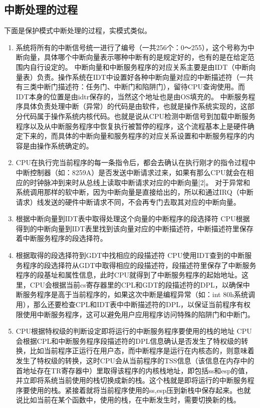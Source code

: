 \documentclass[a4paper, 11pt]{article} %
\begin{document}
\subsection{中断处理的过程}\cite{intprocess}
下面是保护模式中断处理的过程，实模式类似。
\begin{enumerate}
  \item 系统将所有的中断信号统一进行了编号（一共256个：0～255），这个号称为中断向量，具体哪个中断向量表示哪种中断有的是规定好的，也有的是在给定范围内自行设定的。  中断向量和中断服务程序的对应关系主要是由IDT（中断向量表）负责。操作系统在IDT中设置好各种中断向量对应的中断描述符（一共有三类中断门描述符：任务门、中断门和陷阱门），留待CPU查询使用。而IDT本身的位置是由idtr保存的，当然这个地址也是由OS填充的。
  中断服务程序具体负责处理中断（异常）的代码是由软件，也就是操作系统实现的，这部分代码属于操作系统内核代码。也就是说从CPU检测中断信号到加载中断服务程序以及从中断服务程序中恢复执行被暂停的程序，这个流程基本上是硬件确定下来的，而具体的中断向量和服务程序的对应关系设置和中断服务程序的内容是由操作系统确定的。
  
  \item CPU在执行完当前程序的每一条指令后，都会去确认在执行刚才的指令过程中中断控制器（如：8259A）是否发送中断请求过来，如果有那么CPU就会在相应的时钟脉冲到来时从总线上读取中断请求对应的中断向量[2]。
  对于异常和系统调用那样的软中断，因为中断向量是直接给出的，所以和通过IRQ（中断请求）线发送的硬件中断请求不同，不会再专门去取其对应的中断向量。
  
  \item 根据中断向量到IDT表中取得处理这个向量的中断程序的段选择符
  CPU根据得到的中断向量到IDT表里找到该向量对应的中断描述符，中断描述符里保存着中断服务程序的段选择符。
  
  \item 根据取得的段选择符到GDT中找相应的段描述符
  CPU使用IDT查到的中断服务程序的段选择符从GDT中取得相应的段描述符，段描述符里保存了中断服务程序的段基址和属性信息，此时CPU就得到了中断服务程序的起始地址。这里，CPU会根据当前cs寄存器里的CPL和GDT的段描述符的DPL，以确保中断服务程序是高于当前程序的，如果这次中断是编程异常（如：int 80h系统调用），那么还要检查CPL和IDT表中中断描述符的DPL，以保证当前程序有权限使用中断服务程序，这可以避免用户应用程序访问特殊的陷阱门和中断门。
  
  \item CPU根据特权级的判断设定即将运行的中断服务程序要使用的栈的地址
  CPU会根据CPL和中断服务程序段描述符的DPL信息确认是否发生了特权级的转换，比如当前程序正运行在用户态，而中断程序是运行在内核态的，则意味着发生了特权级的转换，这时CPU会从当前程序的TSS信息（该信息在内存中的首地址存在TR寄存器中）里取得该程序的内核栈地址，即包括ss和esp的值，并立即将系统当前使用的栈切换成新的栈。这个栈就是即将运行的中断服务程序要使用的栈。紧接着就将当前程序使用的ss,esp压到新栈中保存起来。也就说比如当前在某个函数中，使用的栈，在中断发生时，需要切换新的栈。
  

\end{enumerate}
\end{document}
